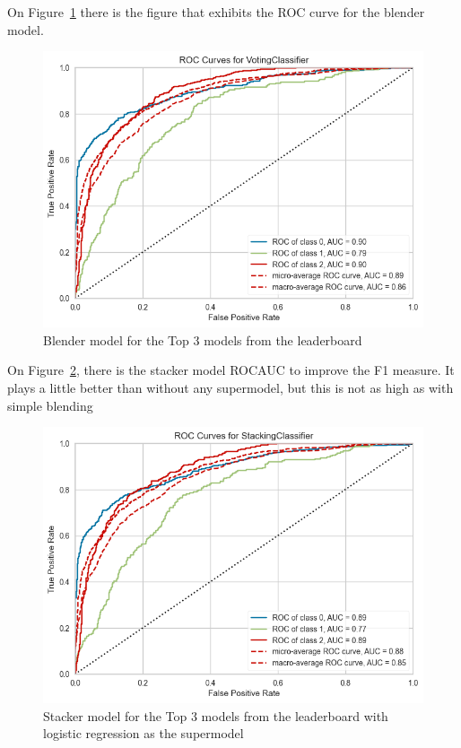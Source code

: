 \documentclass[
  letterpaper,
  DIV=11,
  numbers=noendperiod]{scrartcl}
\begin{document}
On Figure~\ref{fig-blender} there is the figure that exhibits the ROC
curve for the blender model.

\begin{figure}

{\centering \includegraphics{report_AzadhdhinNedalYunisAlFraijat_files/figure-pdf/fig-blender-output-1.png}

}

\caption{\label{fig-blender}Blender model for the Top 3 models from the
leaderboard}

\end{figure}

On Figure~\ref{fig-stacker}, there is the stacker model ROCAUC to
improve the F1 measure. It plays a little better than without any
supermodel, but this is not as high as with simple blending

\begin{figure}

{\centering \includegraphics{report_AzadhdhinNedalYunisAlFraijat_files/figure-pdf/fig-stacker-output-1.png}

}

\caption{\label{fig-stacker}Stacker model for the Top 3 models from the
leaderboard with logistic regression as the supermodel}

\end{figure}
\end{document}
